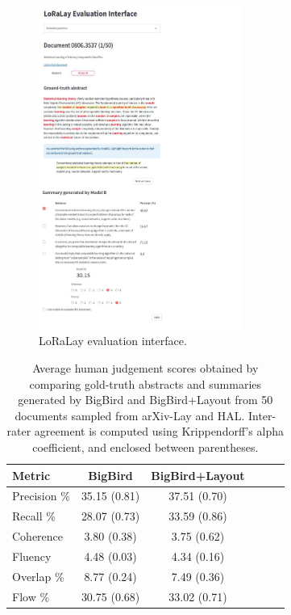 \begin{figure}[H]
    \hspace{5cm}
    \centering
    \includegraphics[width=0.6\textwidth]{images/chapter5/interface_preview.pdf}
  \caption{LoRaLay evaluation interface.}
  \label{fig:chapter5-loralay-eval-interface}
\end{figure}


\begin{table}[ht]
\centering
\small
\begin{tabular}{lccccc}
\toprule
\textbf{Metric}        & \textbf{BigBird} & \textbf{BigBird+Layout} \\ 
\midrule
Precision \%    &    35.15 \scriptsize{(0.81)}            &      37.51 \scriptsize{(0.70)}                   \\
Recall \%       &    28.07 \scriptsize{(0.73)}             &     33.59 \scriptsize{(0.86)}                   \\
Coherence     &     3.80 \scriptsize{(0.38)}             &      3.75 \scriptsize{(0.62)}                   \\ 
Fluency       &     4.48 \scriptsize{(0.03)}             &      4.34 \scriptsize{(0.16)}                   \\
Overlap \%     &    8.77 \scriptsize{(0.24)}             &     7.49 \scriptsize{(0.36)}                    \\ 
Flow \%             &   30.75 \scriptsize{(0.68)}          &    33.02 \scriptsize{(0.71)}                     \\
\bottomrule
\end{tabular}
\caption{Average human judgement scores obtained by comparing gold-truth abstracts and summaries generated by BigBird and BigBird+Layout from 50 documents sampled from arXiv-Lay and HAL. Inter-rater agreement	is computed using Krippendorff's alpha coefficient, and enclosed between parentheses.}
\label{tab:human-eval-scores}
\end{table}

